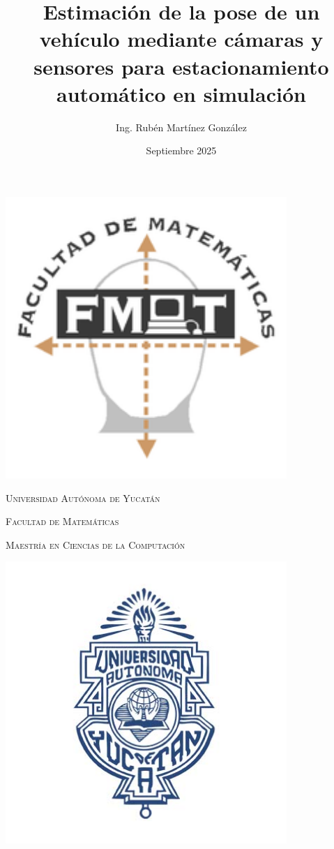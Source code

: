 \documentclass[10pt,letterpaper,final]{article}
\title{Estimación de la pose de un vehículo mediante cámaras y sensores para estacionamiento automático en simulación}
\author{Ing. Rubén Martínez González}
\date{Septiembre 2025}
\newcommand{\university}{Universidad Autónoma de Yucatán}
\newcommand{\faculty}{Facultad de Matemáticas}
\newcommand{\degree}{Maestría en Ciencias de la Computación}
\begin{document}
\begin{titlepage}
    \centering
    \begin{minipage}{0.25\textwidth}
        \centering
        \includegraphics[width=0.8\textwidth]{img/fmat.png}
    \end{minipage}%
    \hfill
    \begin{minipage}{0.5\textwidth}
        \centering
        {\scshape\small \university \par}
        \vspace{0.2cm}
        {\scshape\small \faculty \par}
        \vspace{0.2cm}
        {\scshape\small \degree \par}
    \end{minipage}%
    \hfill
    \begin{minipage}{0.25\textwidth}
        \centering
        \includegraphics[width=0.8\textwidth]{img/UADY.jpg}
    \end{minipage}


\end{titlepage}
\end{document}
